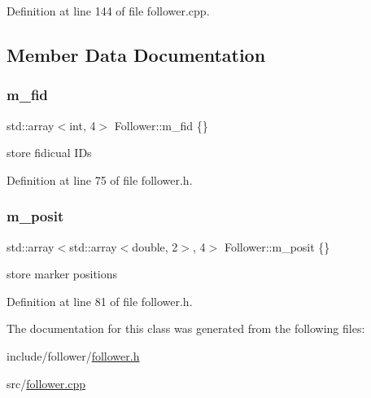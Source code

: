 Definition at line 144 of file follower.\+cpp.



\subsection{Member Data Documentation}
\mbox{\label{class_follower_a350054bbd7659d493cccc4b4ad9bc460}} 
\subsubsection{\texorpdfstring{m\+\_\+fid}{m\_fid}}
{\footnotesize\ttfamily std\+::array$<$int, 4$>$ Follower\+::m\+\_\+fid \{\}}



store fidicual I\+Ds 



Definition at line 75 of file follower.\+h.

\mbox{\label{class_follower_a6d4e1ebbe79cc8af601d53cba7aeb30a}} 
\subsubsection{\texorpdfstring{m\+\_\+posit}{m\_posit}}
{\footnotesize\ttfamily std\+::array$<$std\+::array$<$double, 2$>$, 4$>$ Follower\+::m\+\_\+posit \{\}}



store marker positions 



Definition at line 81 of file follower.\+h.



The documentation for this class was generated from the following files\+:\begin{DoxyCompactItemize}
\item 
include/follower/\hyperlink{follower_8h}{follower.\+h}\item 
src/\hyperlink{follower_8cpp}{follower.\+cpp}\end{DoxyCompactItemize}
